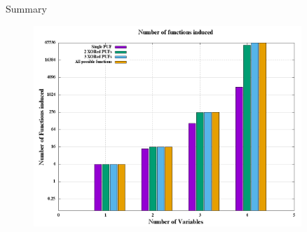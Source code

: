 \documentclass[10pt, compress]{beamer}
\begin{document}
\begin{frame}{Summary}
    \begin{figure}
        \centering
        \includegraphics[width=0.9\textwidth]{figures/hist.png}
    \end{figure}
\end{frame}
\end{document}
